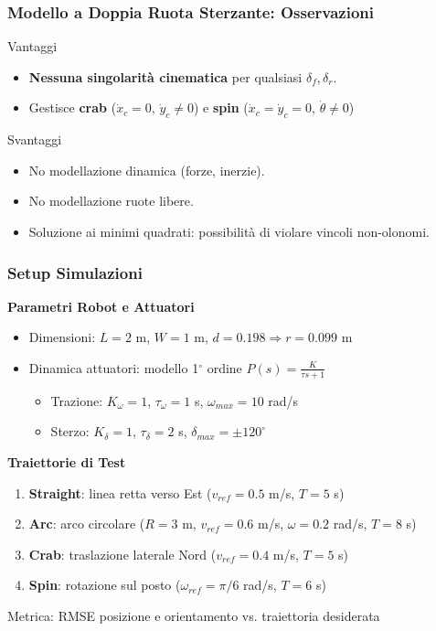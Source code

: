 \begin{frame}
    \frametitle{Modello a Doppia Ruota Sterzante: Osservazioni}
    \begin{block}{Vantaggi}
        \begin{itemize}
            \item \textbf{Nessuna singolarità cinematica} per qualsiasi $\delta_f, \delta_r$.
            \item Gestisce \textbf{crab} ($\dot{x}_c=0$, $\dot{y}_c\neq0$) e \textbf{spin} ($\dot{x}_c=\dot{y}_c=0$, $\dot{\theta}\neq0$)
        \end{itemize}
    \end{block}
    \begin{alertblock}{Svantaggi}
        \begin{itemize}
            \item No modellazione dinamica (forze, inerzie).
            \item No modellazione ruote libere.
            \item Soluzione ai minimi quadrati: possibilità di violare vincoli non-olonomi.
        \end{itemize}
    \end{alertblock}
\end{frame}


\begin{frame}
    \frametitle{Setup Simulazioni}
    \textbf{Parametri Robot e Attuatori}
    \begin{itemize}
        \item Dimensioni: $L = 2$ m, $W = 1$ m, $d = 0.198\Rightarrow r= 0.099$ m
        \item Dinamica attuatori: modello 1$^\circ$ ordine $P(s) = \frac{K}{\tau s + 1}$
              \begin{itemize}
                  \item Trazione: $K_{\omega} = 1$, $\tau_\omega = 1$ s, $\omega_{max} = 10$ rad/s
                  \item Sterzo: $K_{\delta} = 1$, $\tau_\delta = 2$ s, $\delta_{max} = \pm 120^\circ$
              \end{itemize}
    \end{itemize}

    \vspace{0.3cm}

    \textbf{Traiettorie di Test}
    \begin{enumerate}
        \item \textbf{Straight}: linea retta verso Est ($v_{ref} = 0.5$ m/s, $T = 5$ s)
        \item \textbf{Arc}: arco circolare ($R = 3$ m, $v_{ref} = 0.6$ m/s, $\omega = 0.2$ rad/s, $T = 8$ s)
        \item \textbf{Crab}: traslazione laterale Nord ($v_{ref} = 0.4$ m/s, $T = 5$ s)
        \item \textbf{Spin}: rotazione sul posto ($\omega_{ref} = \pi/6$ rad/s, $T = 6$ s)
    \end{enumerate}

    \vspace{0.2cm}
    \small{Metrica: RMSE posizione e orientamento vs. traiettoria desiderata}
\end{frame}

